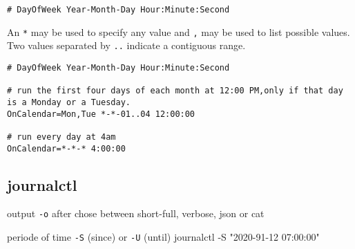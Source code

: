 \begin{verbatim}
# DayOfWeek Year-Month-Day Hour:Minute:Second
\end{verbatim}
An \verb+*+ may be used to specify any value and \verb+,+ may be used to list
possible values. Two values separated by \verb+..+ indicate a contiguous range. 

\begin{verbatim}
# DayOfWeek Year-Month-Day Hour:Minute:Second

# run the first four days of each month at 12:00 PM,only if that day is a Monday or a Tuesday.
OnCalendar=Mon,Tue *-*-01..04 12:00:00

# run every day at 4am
OnCalendar=*-*-* 4:00:00
\end{verbatim}


\subsection{journalctl}
output \verb+-o+ after chose between short-full, verbose, json or cat

periode of time
\verb+-S+ (since) or \verb+-U+ (until)
journalctl -S "2020-91-12 07:00:00"
